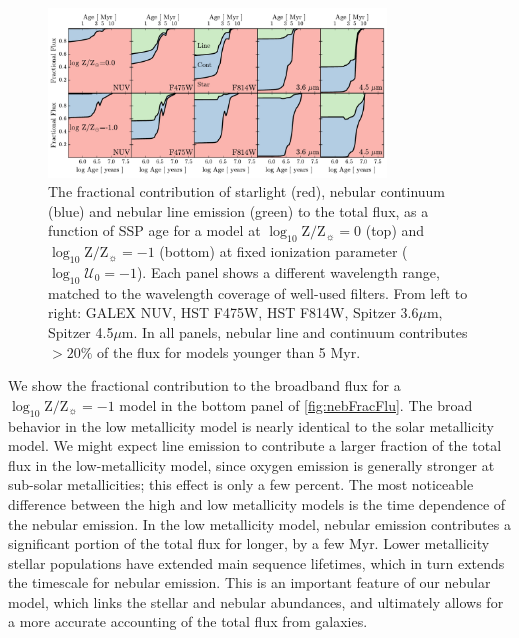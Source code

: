 \documentclass[twocolumn, tighten]{aastex61}
\newcommand{\Fig}[1]{\autoref{fig:#1}}
\newcommand{\logten}{\ensuremath{\log_{10}}}
\newcommand{\logZeq}[1]{\ensuremath{\logten \mathrm{Z}/\mathrm{Z}_{\sun} = #1}}
\newcommand{\logU}{\ensuremath{\logten \mathcal{U}_0}}
\begin{document}
\begin{figure}
  \begin{centering}
    \includegraphics[width=0.8\textwidth]{f12.pdf}
    \caption{The fractional contribution of starlight (red), nebular continuum (blue) and nebular line emission (green) to the total flux, as a function of SSP age for a model at \logZeq{0} (top) and \logZeq{-1} (bottom) at fixed ionization parameter ($\logU=-1$). Each panel shows a different wavelength range, matched to the wavelength coverage of well-used filters. From left to right: GALEX NUV, HST F475W, HST F814W, Spitzer 3.6$\mu$m, Spitzer 4.5$\mu$m. In all panels, nebular line and continuum contributes $>20\%$ of the flux for models younger than 5 Myr.}
    \label{fig:nebFracFlu}
  \end{centering}
\end{figure}

We show the fractional contribution to the broadband flux for a \logZeq{-1} model in the bottom panel of \Fig{nebFracFlu}. The broad behavior in the low metallicity model is nearly identical to the solar metallicity model. We might expect line emission to contribute a larger fraction of the total flux in the low-metallicity model, since oxygen emission is generally stronger at sub-solar metallicities; this effect is only a few percent. The most noticeable difference between the high and low metallicity models is the time dependence of the nebular emission. In the low metallicity model, nebular emission contributes a significant portion of the total flux for longer, by a few Myr. Lower metallicity stellar populations have extended main sequence lifetimes, which in turn extends the timescale for nebular emission. This is an important feature of our nebular model, which links the stellar and nebular abundances, and ultimately allows for a more accurate accounting of the total flux from galaxies.
\end{document}
